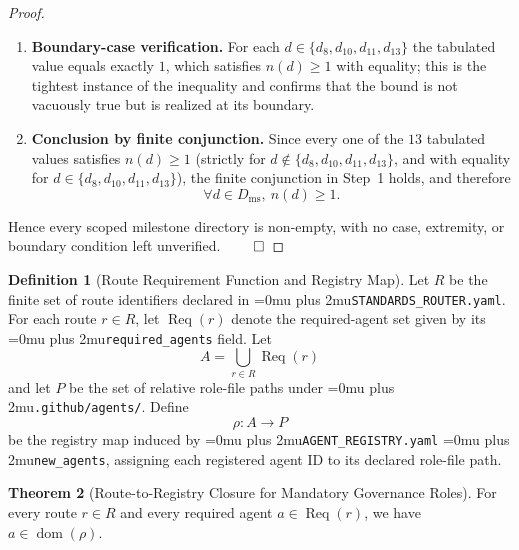 \documentclass[12pt]{article}
\theoremstyle{definition}
\newtheorem{theorem}{Theorem}
\newtheorem{definition}[theorem]{Definition}
\DeclareRobustCommand{\code}[1]{\begingroup\Urlmuskip=0mu plus 2mu\relax\nolinkurl{#1}\endgroup}
\begin{document}
\begin{proof}
\begin{enumerate}
      \item \textbf{Boundary-case verification.} For each
      $d \in \{d_8, d_{10}, d_{11}, d_{13}\}$ the tabulated value
      equals exactly $1$, which satisfies $n(d) \ge 1$ with equality;
      this is the tightest instance of the inequality and confirms
      that the bound is not vacuously true but is realized at its
      boundary.

      \item \textbf{Conclusion by finite conjunction.} Since every
      one of the $13$ tabulated values satisfies $n(d) \ge 1$
      (strictly for $d \notin \{d_8, d_{10}, d_{11}, d_{13}\}$, and
      with equality for $d \in \{d_8, d_{10}, d_{11}, d_{13}\}$), the
      finite conjunction in Step~1 holds, and therefore
      \begin{equation*}
            \forall d \in D_{\mathrm{ms}},\ n(d) \ge 1.
      \end{equation*}
\end{enumerate}

Hence every scoped milestone directory is non-empty, with no case,
extremity, or boundary condition left unverified. $\qed$
\end{proof}

\begin{definition}[Route Requirement Function and Registry Map]
\label{def:route-registry-map}
Let $R$ be the finite set of route identifiers declared in
\code{STANDARDS\_ROUTER.yaml}. For each route $r \in R$, let
$\operatorname{Req}(r)$ denote the required-agent set given by its
\code{required\_agents} field. Let
\begin{equation*}
      A = \bigcup_{r \in R} \operatorname{Req}(r)
\end{equation*}
and let $P$ be the set of relative role-file paths under
\code{.github/agents/}. Define
\begin{equation*}
      \rho : A \to P
\end{equation*}
be the registry map induced by
\code{AGENT\_REGISTRY.yaml} \code{new\_agents}, assigning each
registered agent ID to its declared role-file path.
\end{definition}

\begin{theorem}[Route-to-Registry Closure for Mandatory Governance Roles]
\label{thm:route-registry-closure}
For every route $r \in R$ and every required agent
$a \in \operatorname{Req}(r)$, we have
$a \in \operatorname{dom}(\rho)$.
\end{theorem}
\end{document}
